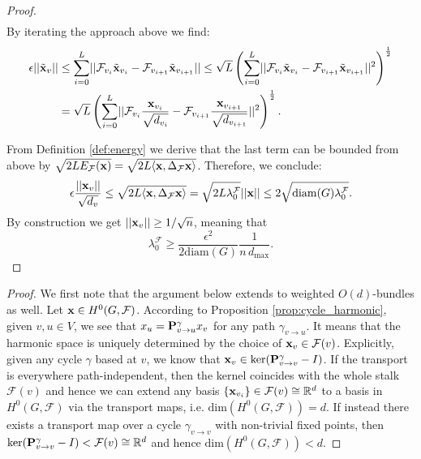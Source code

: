 \documentclass{article}
\def\eps{{\epsilon}}
\def\vx{{\bf{x}}}
\def\mP{{\bf{P}}}
\def\gF{{\mathcal{F}}}
\newcommand{\R}{\mathbb{R}}
\begin{document}
\begin{proof}
\begin{align*}
\end{align*}
\noindent By iterating the approach above we find:
\begin{align}
\eps \lvert\lvert \tilde{\vx}_{v}\rvert\rvert &\leq \sum_{i = 0}^{L} \lvert\lvert \mathcal{F}_{v_{i}}\tilde{\vx}_{v_{i}} -\mathcal{F}_{v_{i+1}}\tilde{\vx}_{v_{i+1}}\rvert\rvert \leq \sqrt{L}\left(\sum_{i = 0}^{L} \lvert\lvert \mathcal{F}_{v_{i}}\tilde{\vx}_{v_{i}} -\mathcal{F}_{v_{i+1}}\tilde{\vx}_{v_{i+1}}\rvert\rvert^{2}\right)^{\frac{1}{2}} \nonumber \\ 
&= \sqrt{L} \left(\sum_{i = 0}^{L} \lvert\lvert \mathcal{F}_{v_{i}}\frac{\vx_{v_{i}}}{\sqrt{d_{v_{i}}}} -\mathcal{F}_{v_{i+1}}\frac{\vx_{v_{i+1}}}{\sqrt{d_{v_{i+1}}}}\rvert\rvert^{2}\right)^{\frac{1}{2}}. \nonumber
\end{align}

\noindent From Definition \ref{def:energy} we derive that the last term can be bounded from above by $\sqrt{2LE_\gF(\vx)} = \sqrt{2L\langle \vx, \Delta_{\mathcal{F}}\vx\rangle}$. Therefore, we conclude:
\[
\eps \frac{\lvert\lvert \vx_{v}\rvert\rvert}{\sqrt{d_{v}} } \leq \sqrt{2L\langle \vx, \Delta_{\mathcal{F}}\vx\rangle} = \sqrt{2 L \lambda_{0}^{\mathcal{F}}}\lvert\lvert \vx\rvert\rvert \leq 2 \sqrt{\mathrm{diam}(G) \lambda_{0}^{\mathcal{F}}}.
\]
\noindent By construction we get $\lvert\lvert \vx_{v}\rvert\rvert \geq 1/\sqrt{n}$, meaning that
\[
 \lambda_{0}^{\mathcal{F}} \geq\frac{\eps^{2}}{2 \mathrm{diam}(G)}\frac{1}{n\,d_{\text{max}}}.
\]
\end{proof}
 
\BundleHDim*
\begin{proof}
We first note that the argument below extends to weighted $O(d)$-bundles as well. Let $\vx\in H^{0}(G,\mathcal{F})$. According to Proposition \ref{prop:cycle_harmonic}, given $v,u \in V$, we see that $x_{u} = \mP^{\gamma}_{v \rightarrow u}x_{v}$ for any path $\gamma_{v\rightarrow u}$. It means that the harmonic space is uniquely determined by the choice of $\vx_{v}\in \mathcal{F}(v)$. Explicitly, given any cycle $\gamma$ based at $v$, we know that $\vx_{v}\in\mathrm{ker}(\mP^{\gamma}_{v\rightarrow v} - I)$. If the transport is everywhere path-independent, then the kernel coincides with the whole stalk $\mathcal{F}(v)$ and hence we can extend any basis $\{\vx_{v_{i}}\}\in\mathcal{F}(v)\cong \R^{d}$ to a basis in $H^{0}(G,\mathcal{F})$ via the transport maps, i.e. $\mathrm{dim}(H^{0}(G,\mathcal{F})) = d$. If instead there exists a transport map over a cycle $\gamma_{v\rightarrow v}$ with non-trivial fixed points, then $\mathrm{ker}(\mP^{\gamma}_{v\rightarrow v} - I) < \mathcal{F}(v) \cong \R^{d}$ and hence $\mathrm{dim}(H^{0}(G,\mathcal{F})) < d$. 
\end{proof} 
\end{document}
